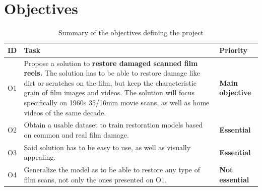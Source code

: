 \documentclass[openany, 12pt]{article}
\begin{document}
	\section{Objectives}
	\begin{table}[ht]
		\centering
		\begin{tabular}{|I|O|M|}
			\hline
			\textbf{ID} & \textbf{Task} & \textbf{Priority} \\ \hline
			O1 & Propose a solution to \textbf{restore damaged scanned film reels.} The solution has to be able to restore damage like dirt or scratches on the film, but keep the characteristic grain of film images and videos. The solution will focus specifically on 1960s 35/16mm movie scans, as well as home videos of the same decade. & \textbf{Main objective} \\ \hline
			O2 & Obtain a usable dataset to train restoration models based on common and real film damage.& \textbf{Essential} \\ \hline
			O3 & Said solution has to be easy to use, as well as visually appealing.& \textbf{Essential} \\  \hline
			O4 & Generalize the model as to be able to restore any type of film scans, not only the ones presented on O1.& \textbf{Not essential} \\ \hline
		\end{tabular}
		\caption{Summary of the objectives defining the project}
	\end{table}
\end{document}
